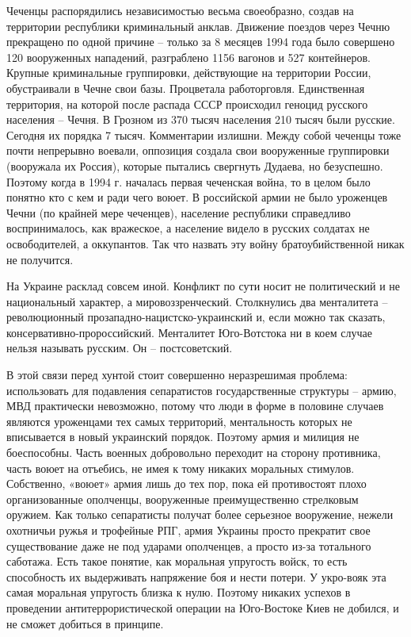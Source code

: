 Чеченцы распорядились независимостью весьма своеобразно, создав на территории
республики криминальный анклав. Движение поездов через Чечню прекращено по
одной причине – только за 8 месяцев 1994 года было совершено 120 вооруженных
нападений, разграблено 1156 вагонов и 527 контейнеров. Крупные криминальные
группировки, действующие на территории России, обустраивали в Чечне свои базы.
Процветала работорговля. Единственная территория, на которой после распада СССР
происходил геноцид русского населения – Чечня. В Грозном из 370 тысяч населения
210 тысяч были русские.  Сегодня их порядка 7 тысяч. Комментарии излишни. Между
собой чеченцы тоже почти непрерывно воевали, оппозиция создала свои вооруженные
группировки (вооружала их Россия), которые пытались свергнуть Дудаева, но
безуспешно. Поэтому когда в 1994 г. началась первая чеченская война, то в целом
было понятно кто с кем и ради чего воюет. В российской армии не было уроженцев
Чечни (по крайней мере чеченцев), население республики справедливо
воспринималось, как вражеское, а население видело в русских солдатах не
освободителей, а оккупантов. Так что назвать эту войну братоубийственной никак
не получится.

На Украине расклад совсем иной. Конфликт по сути носит не политический и не
национальный характер, а мировоззренческий. Столкнулись два менталитета –
революционный прозападно-нацистско-украинский и, если можно так сказать,
консервативно-пророссийский. Менталитет Юго-Вотстока ни в коем случае нельзя
называть русским. Он – постсоветский.

В этой связи перед хунтой стоит совершенно неразрешимая проблема: использовать
для подавления сепаратистов государственные структуры – армию, МВД практически
невозможно, потому что люди в форме в половине случаев являются уроженцами тех
самых территорий, ментальность которых не вписывается в новый украинский
порядок. Поэтому армия и милиция не боеспособны. Часть военных добровольно
переходит на сторону противника, часть воюет на отъебись, не имея к тому
никаких моральных стимулов. Собственно, «воюет» армия лишь до тех пор, пока ей
противостоят плохо организованные ополченцы, вооруженные преимущественно
стрелковым оружием. Как только сепаратисты получат более серьезное вооружение,
нежели охотничьи ружья и трофейные РПГ, армия Украины просто прекратит свое
существование даже не под ударами ополченцев, а просто из-за тотального
саботажа. Есть такое понятие, как моральная упругость войск, то есть
способность их выдерживать напряжение боя и нести потери. У укро-вояк эта самая
моральная упругость близка к нулю. Поэтому никаких успехов в проведении
антитеррористической операции на Юго-Востоке Киев не добился, и не сможет
добиться в принципе.

